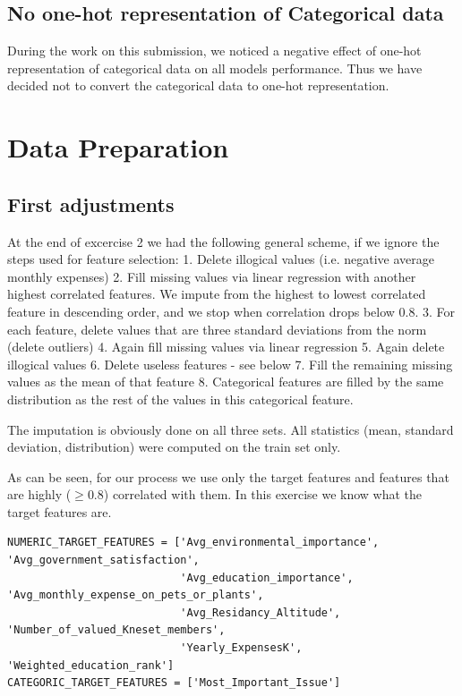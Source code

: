 \documentclass[12pt]{article}
\begin{document}
\subsection{No one-hot representation of Categorical data}
During the work on this submission, we noticed a negative effect of one-hot representation of categorical data on all models performance. Thus we have decided not to convert the categorical data to one-hot representation.

\section{Data Preparation}
\subsection{First adjustments}
At the end of excercise 2 we had the following general scheme, if we ignore the steps used for feature selection:
1. Delete illogical values (i.e. negative average monthly expenses)
2. Fill missing values via linear regression with another highest correlated features. We impute from the highest to lowest correlated feature in descending order, and we stop when correlation drops below 0.8.
3. For each feature, delete values that are three standard deviations from the norm (delete outliers)
4. Again fill missing values via linear regression
5. Again delete illogical values
6. Delete useless features - see below
7. Fill the remaining missing values as the mean of that feature
8. Categorical features are filled by the same distribution as the rest of the values in this categorical feature.

The imputation is obviously done on all three sets. All statistics (mean, standard deviation, distribution) were computed on the train set only.

As can be seen, for our process we use only the target features
and features that are highly ($\geq 0.8$) correlated with them. In this exercise we know what the target features are.\\

\begin{adjustbox}{max width=\linewidth}
\begin{lstlisting}
NUMERIC_TARGET_FEATURES = ['Avg_environmental_importance', 'Avg_government_satisfaction',
                           'Avg_education_importance', 'Avg_monthly_expense_on_pets_or_plants',
                           'Avg_Residancy_Altitude', 'Number_of_valued_Kneset_members',
                           'Yearly_ExpensesK', 'Weighted_education_rank']
CATEGORIC_TARGET_FEATURES = ['Most_Important_Issue']
\end{lstlisting}
\end{adjustbox}\\\\
\end{document}
